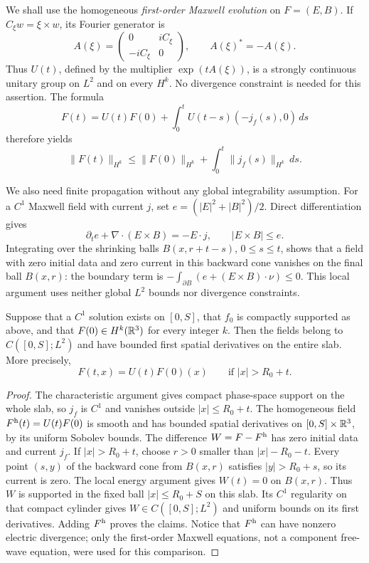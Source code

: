 We shall use the homogeneous \emph{first-order Maxwell evolution} on
$F=(E,B)$.  If $C_\xi w=\xi\times w$, its Fourier generator is
\[
 A(\xi)=\begin{pmatrix}0&iC_\xi\\-iC_\xi&0\end{pmatrix},
 \qquad A(\xi)^*=-A(\xi).
\]
Thus $U(t)$, defined by the multiplier $\exp(tA(\xi))$, is a strongly
continuous unitary group on $L^2$ and on every $H^k$.
No divergence constraint is needed for this assertion.  The formula
\begin{equation}\label{cont:maxwell-duhamel}
 F(t)=U(t)F(0)+\int_0^t U(t-s)(-j_f(s),0)\,ds
\end{equation}
therefore yields
\[
 \|F(t)\|_{H^k}\le\|F(0)\|_{H^k}
       +\int_0^t\|j_f(s)\|_{H^k}\,ds.
\]

We also need finite propagation without any global integrability
assumption.  For a $C^1$ Maxwell field with current $j$, set
$e=(|E|^2+|B|^2)/2$.  Direct differentiation gives
\begin{equation}\label{cont:local-energy}
 \partial_t e+\nabla\cdot(E\times B)=-E\cdot j,
 \qquad |E\times B|\le e.
\end{equation}
Integrating over the shrinking balls $B(x,r+t-s)$, $0\le s\le t$,
shows that a field with zero initial data and zero current in this
backward cone vanishes on the final ball $B(x,r)$: the boundary term is
$-\int_{\partial B}(e+(E\times B)\cdot\nu)\le0$.
This local argument uses neither global $L^2$ bounds nor divergence
constraints.

\begin{lemma}\label{cont:exterior}
Suppose that a $C^1$ solution exists on $[0,S]$, that $f_0$ is compactly
supported as above, and that $F(0)\in H^k(\mathbb R^3)$ for every integer $k$.
Then the fields belong to $C([0,S];L^2)$ and have bounded first spatial
derivatives on the entire slab.  More precisely,
\[
 F(t,x)=U(t)F(0)(x)\qquad\text{if }|x|>R_0+t.
\]
\end{lemma}
\begin{proof}
The characteristic argument gives compact phase-space support on the
whole slab, so $j_f$ is $C^1$ and vanishes outside $|x|\le R_0+t$.
The homogeneous field $F^{\rm h}(t)=U(t)F(0)$ is smooth and has bounded
spatial derivatives on $[0,S]\times\mathbb R^3$, by its uniform Sobolev bounds.
The difference $W=F-F^{\rm h}$ has zero initial data and current $j_f$.
If $|x|>R_0+t$, choose $r>0$ smaller than $|x|-R_0-t$.
Every point $(s,y)$ of the backward cone from $B(x,r)$ satisfies
$|y|>R_0+s$, so its current is zero.  The local energy argument gives
$W(t)=0$ on $B(x,r)$.
Thus $W$ is supported in the fixed ball $|x|\le R_0+S$ on this slab.
Its $C^1$ regularity on that compact cylinder gives
$W\in C([0,S];L^2)$ and uniform bounds on its first derivatives.
Adding $F^{\rm h}$ proves the claims.
Notice that $F^{\rm h}$ can have nonzero electric divergence; only the
first-order Maxwell equations, not a component free-wave equation, were
used for this comparison.
\end{proof}

